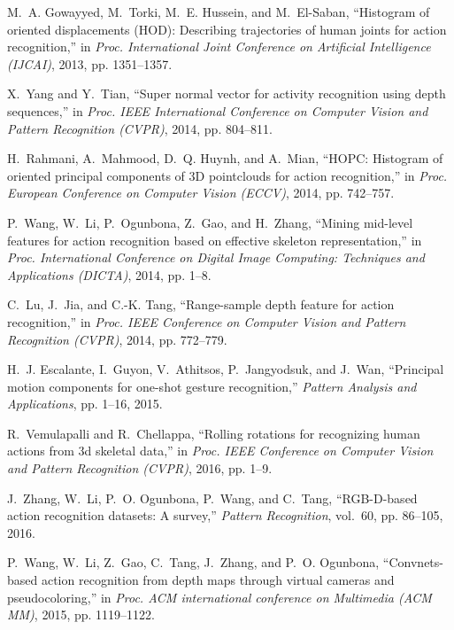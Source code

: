 \documentclass[10pt, a4paper, conference]{IEEEtran}
\begin{document}
\begin{thebibliography}{10}
M.~A. Gowayyed, M.~Torki, M.~E. Hussein, and M.~El-Saban, ``Histogram of
  oriented displacements ({HOD}): Describing trajectories of human joints for
  action recognition,'' in \emph{Proc. International Joint Conference on
  Artificial Intelligence (IJCAI)}, 2013, pp. 1351--1357.

X.~Yang and Y.~Tian, ``Super normal vector for activity recognition using depth
  sequences,'' in \emph{Proc. IEEE International Conference on Computer Vision
  and Pattern Recognition (CVPR)}, 2014, pp. 804--811.

H.~Rahmani, A.~Mahmood, D.~Q. Huynh, and A.~Mian, ``{HOPC}: Histogram of
  oriented principal components of {3D} pointclouds for action recognition,''
  in \emph{Proc. European Conference on Computer Vision (ECCV)}, 2014, pp.
  742--757.

P.~Wang, W.~Li, P.~Ogunbona, Z.~Gao, and H.~Zhang, ``Mining mid-level features
  for action recognition based on effective skeleton representation,'' in
  \emph{Proc. International Conference on Digital Image Computing: Techniques
  and Applications (DICTA)}, 2014, pp. 1--8.

C.~Lu, J.~Jia, and C.-K. Tang, ``Range-sample depth feature for action
  recognition,'' in \emph{Proc. IEEE Conference on Computer Vision and Pattern
  Recognition (CVPR)}, 2014, pp. 772--779.

H.~J. Escalante, I.~Guyon, V.~Athitsos, P.~Jangyodsuk, and J.~Wan, ``Principal
  motion components for one-shot gesture recognition,'' \emph{Pattern Analysis
  and Applications}, pp. 1--16, 2015.

R.~Vemulapalli and R.~Chellappa, ``Rolling rotations for recognizing human
  actions from 3d skeletal data,'' in \emph{Proc. IEEE Conference on Computer
  Vision and Pattern Recognition (CVPR)}, 2016, pp. 1--9.

J.~Zhang, W.~Li, P.~O. Ogunbona, P.~Wang, and C.~Tang, ``{RGB-D}-based action
  recognition datasets: A survey,'' \emph{Pattern Recognition}, vol.~60, pp.
  86--105, 2016.

P.~Wang, W.~Li, Z.~Gao, C.~Tang, J.~Zhang, and P.~O. Ogunbona, ``Convnets-based
  action recognition from depth maps through virtual cameras and
  pseudocoloring,'' in \emph{Proc. ACM international conference on Multimedia
  (ACM MM)}, 2015, pp. 1119--1122.


\end{thebibliography}
\end{document}
